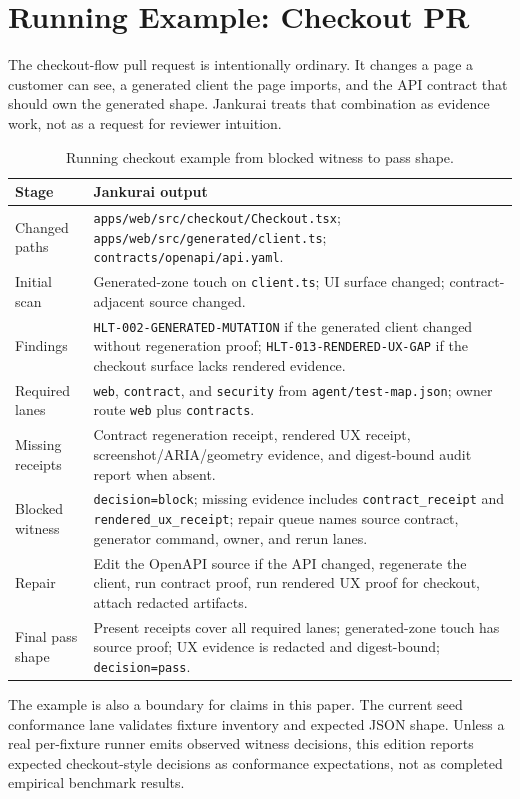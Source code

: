 \section{Running Example: Checkout PR}

The checkout-flow pull request is intentionally ordinary. It changes a page a customer can see, a generated client the page imports, and the API contract that should own the generated shape. Jankurai treats that combination as evidence work, not as a request for reviewer intuition.

\begin{table}[t]
\caption{Running checkout example from blocked witness to pass shape.}
\label{tab:running-example}
\centering
\scriptsize
\begin{tabularx}{\columnwidth}{L{0.24\columnwidth} Y}
\toprule
\textbf{Stage} & \textbf{Jankurai output} \\
\midrule
Changed paths & \texttt{apps/web/src/checkout/Checkout.tsx}; \texttt{apps/web/src/generated/client.ts}; \texttt{contracts/openapi/api.yaml}. \\
Initial scan & Generated-zone touch on \texttt{client.ts}; UI surface changed; contract-adjacent source changed. \\
Findings & \texttt{HLT-002-GENERATED-MUTATION} if the generated client changed without regeneration proof; \texttt{HLT-013-RENDERED-UX-GAP} if the checkout surface lacks rendered evidence. \\
Required lanes & \texttt{web}, \texttt{contract}, and \texttt{security} from \texttt{agent/test-map.json}; owner route \texttt{web} plus \texttt{contracts}. \\
Missing receipts & Contract regeneration receipt, rendered UX receipt, screenshot/ARIA/geometry evidence, and digest-bound audit report when absent. \\
Blocked witness & \texttt{decision=block}; missing evidence includes \texttt{contract\_receipt} and \texttt{rendered\_ux\_receipt}; repair queue names source contract, generator command, owner, and rerun lanes. \\
Repair & Edit the OpenAPI source if the API changed, regenerate the client, run contract proof, run rendered UX proof for checkout, attach redacted artifacts. \\
Final pass shape & Present receipts cover all required lanes; generated-zone touch has source proof; UX evidence is redacted and digest-bound; \texttt{decision=pass}. \\
\bottomrule
\end{tabularx}
\end{table}

The example is also a boundary for claims in this paper. The current seed conformance lane validates fixture inventory and expected JSON shape. Unless a real per-fixture runner emits observed witness decisions, this edition reports expected checkout-style decisions as conformance expectations, not as completed empirical benchmark results.
